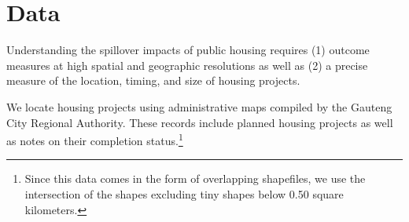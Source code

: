 \documentclass[12pt]{article}
\begin{document}

\section{Data}\label{section:data}

Understanding the spillover impacts of public housing requires (1) outcome measures at high spatial and geographic resolutions as well as (2) a precise measure of the location, timing, and size of housing projects.  


We locate housing projects using administrative maps compiled by the Gauteng City Regional Authority.  These records include planned housing projects as well as notes on their completion status.\footnote{Since this data comes in the form of overlapping shapefiles, we use the intersection of the shapes excluding tiny shapes below 0.50 square kilometers.}  
\end{document}
